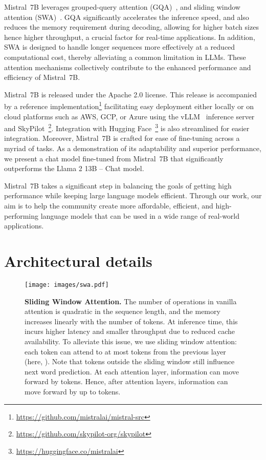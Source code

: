 \documentclass{article}
\def\llama{Llama\xspace}
\def\mistral{Mistral~7B\xspace}
\begin{document}
\mistral leverages grouped-query attention (GQA)~\cite{ainslie2023gqa}, and sliding window attention (SWA)~\cite{child2019generating,beltagy2020longformer}. GQA significantly accelerates the inference speed, and also reduces the memory requirement during decoding, allowing for higher batch sizes hence higher throughput, a crucial factor for real-time applications.
In addition, SWA is designed to handle longer sequences more effectively at a reduced computational cost, thereby alleviating a common limitation in LLMs. These attention mechanisms collectively contribute to the enhanced performance and efficiency of \mistral.

\mistral is released under the Apache 2.0 license.
This release is accompanied by a reference implementation\footnote{\url{https://github.com/mistralai/mistral-src}} facilitating easy deployment either locally or on cloud platforms such as AWS, GCP, or Azure using the vLLM~\cite{kwon2023efficient} inference server and SkyPilot~\footnote{\url{https://github.com/skypilot-org/skypilot}}.
Integration with Hugging Face~\footnote{\url{https://huggingface.co/mistralai}} is also streamlined for easier integration.
Moreover, \mistral is crafted for ease of fine-tuning across a myriad of tasks.
As a demonstration of its adaptability and superior performance, we present a chat model fine-tuned from \mistral that significantly outperforms the \llama 2 13B -- Chat model.

 \mistral takes a significant step in balancing the goals of getting high performance while keeping large language models efficient.
Through our work, our aim is to help the community create more affordable, efficient, and high-performing language models that can be used in a wide range of real-world applications.


\section{Architectural details}

\begin{figure}[h]
\centering
\texttt{[image: images/swa.pdf]}
\caption{\small \textbf{Sliding Window Attention.} The number of operations in vanilla attention is quadratic in the sequence length, and the memory increases linearly with the number of tokens. At inference time, this incurs higher latency and smaller throughput due to reduced cache availability. To alleviate this issue, we use sliding window attention: each token can attend to at most  tokens from the previous layer (here, ). Note that tokens outside the sliding window still influence next word prediction. At each attention layer, information can move forward by  tokens. Hence, after  attention layers, information can move forward by up to  tokens.}
\label{fig:swa}
\end{figure}
\end{document}
